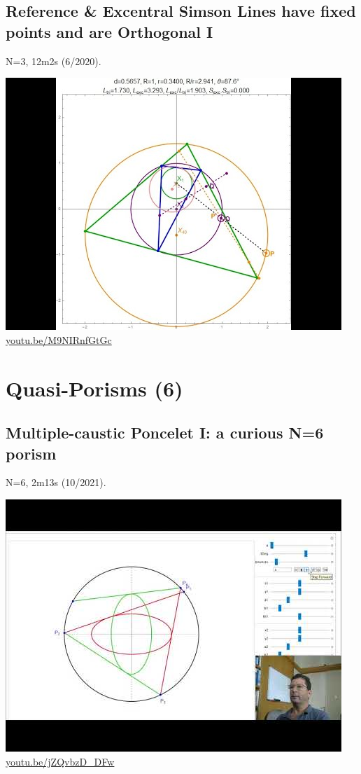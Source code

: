 \documentclass[12pt]{amsart}
\begin{document}
\subsection{Reference \& Excentral Simson Lines have fixed points and are Orthogonal I}
\label{vid:M9NIRnfGtGc}
\noindent N=3, 12m2s (6/2020). 
\begin{center}\includegraphics[width=.5\textwidth]{pics/M9NIRnfGtGc.jpg} \\ 
\href{https://youtu.be/M9NIRnfGtGc}{\url{youtu.be/M9NIRnfGtGc}}\end{center}
% 

\section{Quasi-Porisms (6)}

\subsection{Multiple-caustic Poncelet I: a curious N=6 porism}
\label{vid:jZQvbzD_DFw}
\noindent N=6, 2m13s (10/2021). 
\begin{center}\includegraphics[width=.5\textwidth]{pics/jZQvbzD_DFw.jpg} \\ 
\href{https://youtu.be/jZQvbzD_DFw}{\url{youtu.be/jZQvbzD\_DFw}}\end{center}
% 
\end{document}
